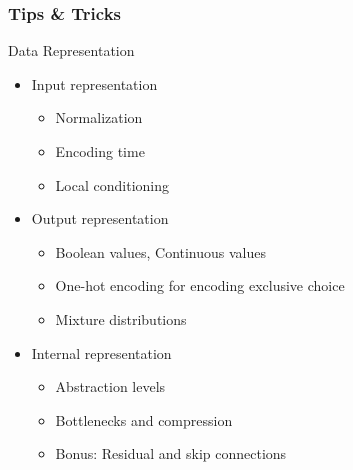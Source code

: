 \documentclass[8pt]{beamer}
\begin{document}
\begin{frame}
\frametitle{Tips \& Tricks}
 \begin{block}{Data Representation}
  \begin{itemize}
   \item Input representation
   \begin{itemize}
    \item Normalization
    \item Encoding time
    \item Local conditioning
   \end{itemize}
   \item Output representation
   \begin{itemize}
    \item Boolean values, Continuous values
    \item One-hot encoding for encoding exclusive choice
    \item Mixture distributions
   \end{itemize}
   \item Internal representation
   \begin{itemize}
    \item Abstraction levels
    \item Bottlenecks and compression
    \item Bonus: Residual and skip connections
   \end{itemize}
  \end{itemize}
 \end{block}
\end{frame}
\end{document}
